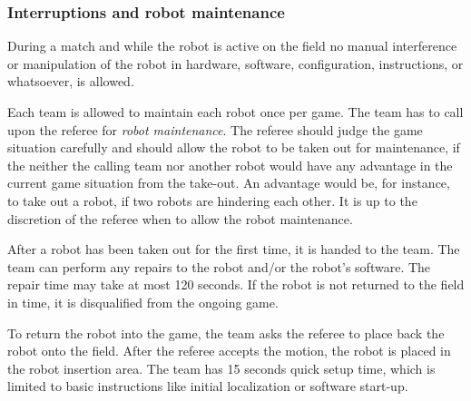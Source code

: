 \documentclass[12pt,twoside]{article}
\begin{document}

\subsubsection{Interruptions and robot maintenance}
\label{sec:robot-maintenance}
During a match and while the robot is active on the field no manual
interference or manipulation of the robot in hardware, software,
configuration, instructions, or whatsoever, is allowed.


Each team is allowed to maintain each robot once per game. The team
has to call upon the referee for \textit{robot maintenance}. The
referee should judge the game situation carefully and should allow the
robot to be taken out for maintenance, if the neither the calling team
nor another robot would have any advantage in the current game
situation from the take-out. An advantage would be, for instance, to
take out a robot, if two robots are hindering each other. It is up to
the discretion of the referee when to allow the robot maintenance.


After a robot has been taken out for the first time, it is handed to
the team. The team can perform any repairs to the robot and/or the
robot's software. %
The repair time may take at most 120 seconds. If the robot is not
returned to the field in time, it is disqualified from the ongoing
game.

To return the robot into the game, the team asks the referee to place
back the robot onto the field. After the referee accepts the motion,
the robot is placed in the robot insertion area. The team has 15
seconds quick setup time, which is limited to basic instructions like
initial localization or software start-up.
\end{document}
